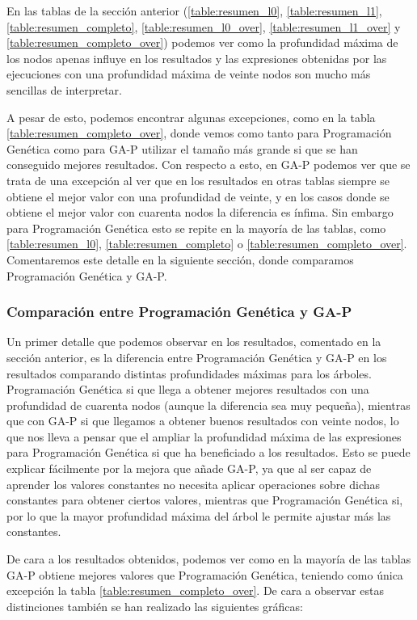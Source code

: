 En las tablas de la sección anterior (\ref{table:resumen_l0}, \ref{table:resumen_l1}, \ref{table:resumen_completo}, \ref{table:resumen_l0_over}, \ref{table:resumen_l1_over} y \ref{table:resumen_completo_over}) podemos ver como la profundidad máxima de los nodos apenas influye en los resultados y las expresiones obtenidas por las ejecuciones con una profundidad máxima de veinte nodos son mucho más sencillas de interpretar.

A pesar de esto, podemos encontrar algunas excepciones, como en la tabla \ref{table:resumen_completo_over}, donde vemos como tanto para Programación Genética como para GA-P utilizar el tamaño más grande si que se han conseguido mejores resultados. Con respecto a esto, en GA-P podemos ver que se trata de una excepción al ver que en los resultados en otras tablas siempre se obtiene el mejor valor con una profundidad de veinte, y en los casos donde se obtiene el mejor valor con cuarenta nodos la diferencia es ínfima. Sin embargo para Programación Genética esto se repite en la mayoría de las tablas, como \ref{table:resumen_l0}, \ref{table:resumen_completo} o \ref{table:resumen_completo_over}. Comentaremos este detalle en la siguiente sección, donde comparamos Programación Genética y GA-P.

\newpage

\subsubsection{Comparación entre Programación Genética y GA-P}

Un primer detalle que podemos observar en los resultados, comentado en la sección anterior, es la diferencia entre Programación Genética y GA-P en los resultados comparando distintas profundidades máximas para los árboles. Programación Genética si que llega a obtener mejores resultados con una profundidad de cuarenta nodos (aunque la diferencia sea muy pequeña), mientras que con GA-P si que llegamos a obtener buenos resultados con veinte nodos, lo que nos lleva a pensar que el ampliar la profundidad máxima de las expresiones para Programación Genética si que ha beneficiado a los resultados. Esto se puede explicar fácilmente por la mejora que añade GA-P, ya que al ser capaz de aprender los valores constantes no necesita aplicar operaciones sobre dichas constantes para obtener ciertos valores, mientras que Programación Genética si, por lo que la mayor profundidad máxima del árbol le permite ajustar más las constantes.

De cara a los resultados obtenidos, podemos ver como en la mayoría de las tablas GA-P obtiene mejores valores que Programación Genética, teniendo como única excepción la tabla \ref{table:resumen_completo_over}. De cara a observar estas distinciones también se han realizado las siguientes gráficas:

